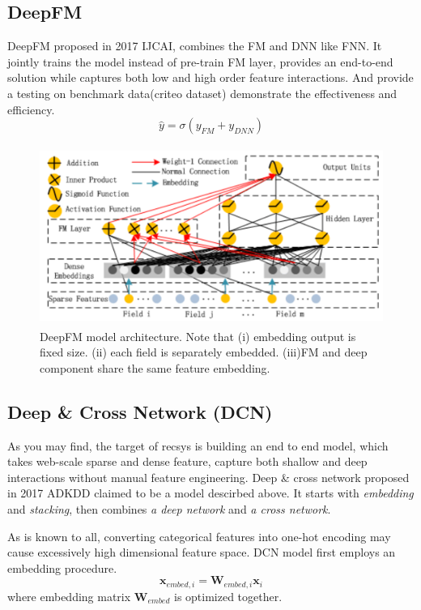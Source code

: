 \documentclass{article}
\begin{document}
\subsection{DeepFM}
DeepFM\cite{DBLP:journals/corr/GuoTYLH17} proposed in 2017 IJCAI, combines the FM and DNN like FNN. It jointly trains the model instead of pre-train FM layer, provides an end-to-end solution while captures both low and high order feature interactions. And provide a testing on benchmark data(criteo dataset) demonstrate the effectiveness and efficiency.
$$\widehat{y}=\sigma(y_{FM}+y_{DNN})$$
\begin{figure}[H]
\centering
\includegraphics[width=4.5in,height=2.3in]{deepFM}
\caption{DeepFM model architecture. Note that (\textrm{i}) embedding output is fixed size. (\textrm{ii}) each field is separately embedded. (\textrm{iii})FM and deep component share the same feature embedding.}
\end{figure}
\subsection{Deep \& Cross Network (DCN)}
As you may find, the target of recsys is building an end to end model, which takes web-scale sparse and dense feature, capture both shallow and deep interactions without manual feature engineering. Deep \& cross network \cite{DBLP:journals/corr/abs-1708-05123} proposed in 2017 ADKDD claimed to be a model descirbed above. It starts with \emph{embedding} and \emph{stacking}, then combines \emph{a deep network} and \emph{a cross network}.

As is known to all, converting categorical features into one-hot encoding may cause excessively high dimensional feature space. DCN model first employs an embedding procedure.
$$\textbf{x}_{embed,i}=\textbf{W}_{embed,i}\textbf{x}_{i}$$
where embedding matrix $\textbf{W}_{embed}$ is optimized together.
\end{document}
